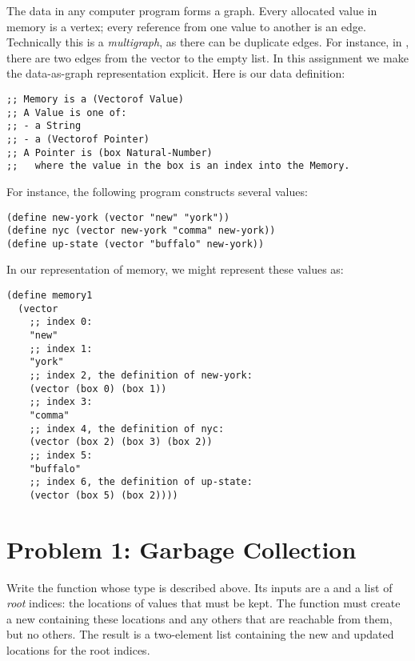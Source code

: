 \documentclass{article}
\begin{document}
The data in any computer program forms a graph.  Every allocated value in memory
is a vertex; every reference from one value to another is an edge.
Technically this is a \emph{multigraph}, as there can be duplicate edges.  For
instance, in , there are two edges from the vector to the
empty list.  In this assignment we make the data-as-graph representation
explicit.  Here is our data definition:

\begin{verbatim}
;; Memory is a (Vectorof Value)
;; A Value is one of:
;; - a String
;; - a (Vectorof Pointer)
;; A Pointer is (box Natural-Number)
;;   where the value in the box is an index into the Memory.
\end{verbatim}

For instance, the following program constructs several values:
\begin{verbatim}
(define new-york (vector "new" "york"))
(define nyc (vector new-york "comma" new-york))
(define up-state (vector "buffalo" new-york))
\end{verbatim}
In our representation of memory, we might represent these values as:
\begin{verbatim}
(define memory1
  (vector
    ;; index 0:
    "new"
    ;; index 1:
    "york"
    ;; index 2, the definition of new-york:
    (vector (box 0) (box 1))
    ;; index 3:
    "comma"
    ;; index 4, the definition of nyc:
    (vector (box 2) (box 3) (box 2))
    ;; index 5:
    "buffalo"
    ;; index 6, the definition of up-state:
    (vector (box 5) (box 2))))
\end{verbatim}

\newpage
\section{Problem 1: Garbage Collection}


\medskip

Write the function  whose type is described above.  Its inputs are
a  and a list of \emph{root} indices: the locations of values that
must be kept.  The function  must create a new 
containing these locations and any others that are reachable from them, but no
others.  The result is a two-element list containing the new  and
updated locations for the root indices.
\end{document}

